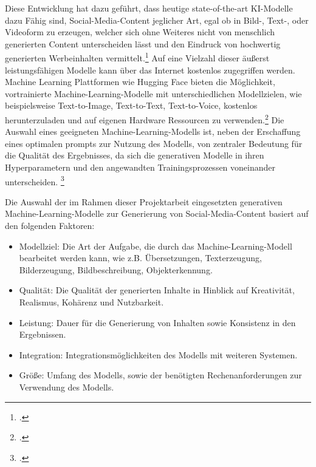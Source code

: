Diese Entwicklung hat dazu geführt, dass heutige state-of-the-art KI-Modelle dazu Fähig sind, Social-Media-Content jeglicher Art, egal ob in Bild-, Text-, oder Videoform zu erzeugen, welcher sich ohne Weiteres nicht von menschlich generierten Content unterscheiden lässt und den Eindruck von hochwertig generierten Werbeinhalten vermittelt.\footcite[1]{hartmann2024power}
Auf eine Vielzahl dieser äußerst leistungsfähigen Modelle kann über das Internet kostenlos zugegriffen werden.
Machine Learning Plattformen wie Hugging Face bieten die Möglichkeit, vortrainierte Machine-Learning-Modelle mit unterschiedlichen Modellzielen, wie beispielsweise Text-to-Image, Text-to-Text, Text-to-Voice, kostenlos herunterzuladen und auf eigenen Hardware Ressourcen zu verwenden.\footcite{huggingface}
Die Auswahl eines geeigneten Machine-Learning-Modells ist, neben der Erschaffung eines optimalen prompts zur Nutzung des Modells, von zentraler Bedeutung für die Qualität des Ergebnisses, da sich die generativen Modelle in ihren Hyperparametern und den angewandten Trainingsprozessen voneinander unterscheiden. \footcite[S. 9 ff.]{betker2023improving}

Die Auswahl der im Rahmen dieser Projektarbeit eingesetzten generativen Machine-Learning-Modelle zur Generierung von Social-Media-Content basiert auf den folgenden Faktoren:

\begin{itemize}
    \item Modellziel: Die Art der Aufgabe, die durch das Machine-Learning-Modell bearbeitet werden kann, wie z.B. Übersetzungen, Texterzeugung, Bilderzeugung, Bildbeschreibung, Objekterkennung.
    \item Qualität: Die Qualität der generierten Inhalte in Hinblick auf Kreativität, Realismus, Kohärenz und Nutzbarkeit.
    \item Leistung: Dauer für die Generierung von Inhalten sowie Konsistenz in den Ergebnissen.
    \item Integration: Integrationsmöglichkeiten des Modells mit weiteren Systemen.
    \item Größe: Umfang des Modells, sowie der benötigten Rechenanforderungen zur Verwendung des Modells.
\end{itemize}

